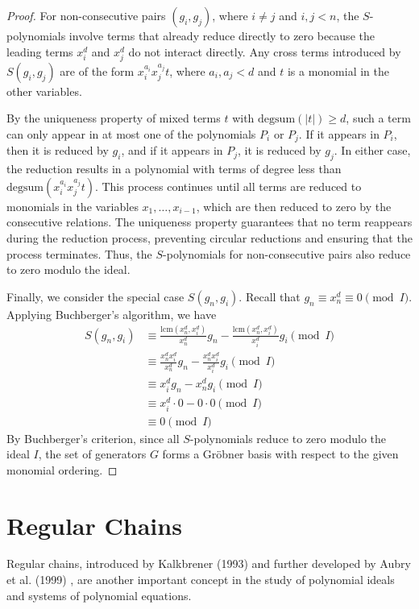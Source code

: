 \documentclass[12pt,reqno]{article}
\theoremstyle{plain}
\newcommand{\lcm}{\mathrm{lcm}}
\newcommand{\degsum}{\mathrm{degsum}}
\begin{document}
\begin{proof}
For non-consecutive pairs $(g_i, g_j)$, where $i \neq j$ and $i,j < n$, the $S$-polynomials involve terms that already reduce directly to zero because the leading terms $x_i^d$ and $x_j^d$ do not interact directly. Any cross terms introduced by $S(g_i, g_j)$ are of the form $x_i^{a_i} x_j^{a_j} t$, where $a_i, a_j < d$ and $t$ is a monomial in the other variables.

By the uniqueness property of mixed terms $t$ with $\degsum(|t|) \geq d$, such a term can only appear in at most one of the polynomials $P_i$ or $P_j$. If it appears in $P_i$, then it is reduced by $g_i$, and if it appears in $P_j$, it is reduced by $g_j$. In either case, the reduction results in a polynomial with terms of degree less than $\degsum(x_i^{a_i} x_j^{a_j} t)$. This process continues until all terms are reduced to monomials in the variables $x_1, \ldots, x_{i-1}$, which are then reduced to zero by the consecutive relations. The uniqueness property guarantees that no term reappears during the reduction process, preventing circular reductions and ensuring that the process terminates. Thus, the $S$-polynomials for non-consecutive pairs also reduce to zero modulo the ideal.

Finally, we consider the special case $S(g_n,g_i)$. Recall that $g_n \equiv x_n^d \equiv 0 \pmod{I}$. Applying Buchberger's algorithm, we have
\begin{align*}
S(g_n, g_i) &\equiv \frac{\lcm(x_n^d, x_i^d)}{x_n^d} g_n
- \frac{\lcm(x_n^d, x_i^d)}{x_i^d} g_i \pmod{I} \\
&\equiv \frac{x_n^d x_i^d}{x_n^d} g_n - \frac{x_n^d x_i^d}{x_i^d} g_i \pmod{I} \\
&\equiv x_i^d g_n - x_n^d g_i \pmod{I} \\
&\equiv x_i^d \cdot 0 - 0 \cdot 0 \pmod{I} \\
&\equiv 0 \pmod{I}
\end{align*}
By Buchberger's criterion, since all $S$-polynomials reduce to zero modulo the ideal $I$, the set of generators $G$ forms a Gröbner basis with respect to the given monomial ordering.
\end{proof}

\section{Regular Chains}
Regular chains, introduced by Kalkbrener (1993) \cite{kalkbrener1993regularchains} and further developed by Aubry et al. (1999) \cite{aubry1999triangularsets}, are another important concept in the study of polynomial ideals and systems of polynomial equations.
\end{document}
